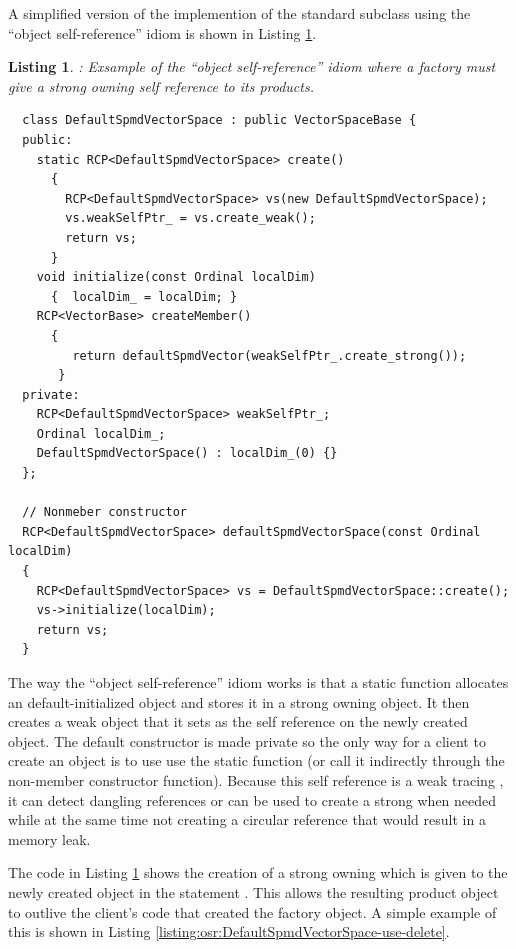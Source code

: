 \documentclass[pdf,ps2pdf,11pt]{SANDreport}
\newtheorem{listing}{Listing}
\begin{document}
A simplified version of the implemention of the
{} standard subclass
{} using the ``object self-reference''
idiom is shown in Listing {}\ref{listing:osr:DefaultSpmdVectorSpace}.


\begin{listing}: Exsample of the ``object self-reference'' idiom where a
factory must give a strong owning {} self reference to its products.  \\
\label{listing:osr:DefaultSpmdVectorSpace}
{\small\begin{verbatim}
  class DefaultSpmdVectorSpace : public VectorSpaceBase {
  public:
    static RCP<DefaultSpmdVectorSpace> create()
      {
        RCP<DefaultSpmdVectorSpace> vs(new DefaultSpmdVectorSpace);
        vs.weakSelfPtr_ = vs.create_weak();
        return vs;
      }
    void initialize(const Ordinal localDim)
      {  localDim_ = localDim; }
    RCP<VectorBase> createMember()
      {
         return defaultSpmdVector(weakSelfPtr_.create_strong());
       }
  private:
    RCP<DefaultSpmdVectorSpace> weakSelfPtr_;
    Ordinal localDim_;
    DefaultSpmdVectorSpace() : localDim_(0) {}
  };

  // Nonmeber constructor
  RCP<DefaultSpmdVectorSpace> defaultSpmdVectorSpace(const Ordinal localDim)
  {
    RCP<DefaultSpmdVectorSpace> vs = DefaultSpmdVectorSpace::create();
    vs->initialize(localDim);
    return vs;
  }
\end{verbatim}}
\end{listing}


The way the ``object self-reference'' idiom works is that a static
function {} allocates an default-initialized
{} object and stores it in a strong
owning {} object.  It then creates a weak {}
object that it sets as the self reference on the newly created
{} object.  The default constructor is
made private so the only way for a client to create an
{} object is to use use the static
{} function (or call it indirectly through the
non-member constructor {} function).
Because this self reference is a weak tracing {}, it can
detect dangling references or can be used to create a strong
{} when needed while at the same time not creating a
circular reference that would result in a memory leak.

The code in Listing {}\ref{listing:osr:DefaultSpmdVectorSpace} shows
the creation of a strong owning {} which is given to the
newly created {} object in the statement
{}.  This
allows the resulting product {} object to
outlive the client's code that created the factory
{} object.  A simple example of this is
shown in Listing
{}\ref{listing:osr:DefaultSpmdVectorSpace-use-delete}.
\end{document}
